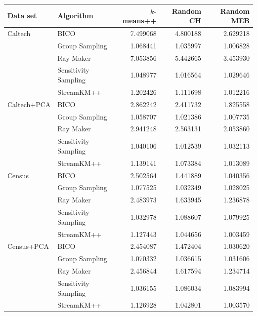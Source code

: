 

\begin{longtable}{llrrr}
\toprule
 Data set  & Algorithm     &        $k$-means++&        Random CH&       Random MEB\\
\midrule
Caltech & BICO &   7.499068 &   4.800188 &   2.629218 \\
      & Group Sampling &   1.068441 &   1.035997 &   1.006828 \\
      & Ray Maker &   7.053856 &   5.442665 &   3.453930 \\
      & Sensitivity Sampling &   1.048977 &   1.016564 &   1.029646 \\
      & StreamKM++ &   1.202426 &   1.111698 &   1.012216 \\
\midrule
Caltech+PCA & BICO &   2.862242 &   2.411732 &   1.825558 \\
      & Group Sampling &   1.058707 &   1.021386 &   1.007735 \\
      & Ray Maker &   2.941248 &   2.563131 &   2.053860 \\
      & Sensitivity Sampling &   1.040106 &   1.012539 &   1.032113 \\
      & StreamKM++ &   1.139141 &   1.073384 &   1.013089 \\
\midrule
Census & BICO &   2.502564 &   1.441889 &   1.040356 \\
      & Group Sampling &   1.077525 &   1.032349 &   1.028025 \\
      & Ray Maker &   2.483973 &   1.633945 &   1.236878 \\
      & Sensitivity Sampling &   1.032978 &   1.088607 &   1.079925 \\
      & StreamKM++ &   1.127443 &   1.044656 &   1.003459 \\
\midrule
Census+PCA & BICO &   2.454087 &   1.472404 &   1.030620 \\
      & Group Sampling &   1.070332 &   1.036615 &   1.031606 \\
      & Ray Maker &   2.456844 &   1.617594 &   1.234714 \\
      & Sensitivity Sampling &   1.036155 &   1.086034 &   1.083994 \\
      & StreamKM++ &   1.126928 &   1.042801 &   1.003570 \\

\end{longtable}
